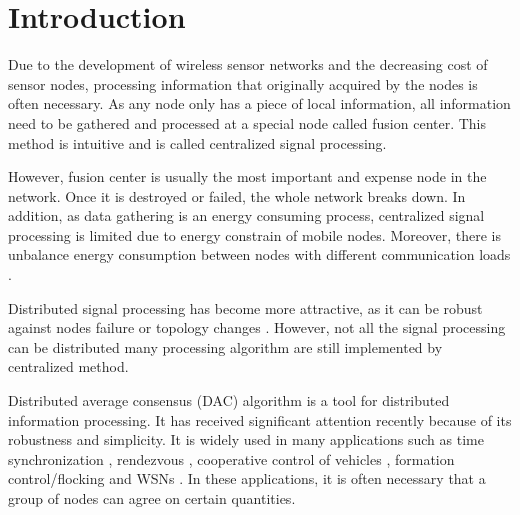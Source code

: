 
\chapter{Introduction }



































Due to the development of wireless sensor networks and the decreasing
cost of sensor nodes,  processing information that originally  acquired
by the nodes is often necessary. As any node only has a piece of local
information,  all information need to be gathered and processed at
a special node called  fusion center. This method is intuitive  and
is called centralized signal processing. 

However, fusion center is usually the most important and expense node
in the network. Once it is destroyed or failed, the whole network
breaks down. In addition, as data gathering is an energy consuming
process, centralized signal processing is limited due to energy constrain
of mobile nodes. Moreover, there is unbalance energy consumption between
nodes with different communication loads \cite{Cristescu2004}\cite{Yuen2008}. 

Distributed signal processing has become more attractive, as it can
be robust against  nodes failure or topology changes \cite{Chair1986}
. However, not all the signal processing can be distributed many processing
algorithm are still implemented by centralized method.

Distributed average consensus (DAC) algorithm is a tool for distributed
information processing. It has received significant attention recently
because of its robustness and simplicity. It is widely used in many
applications such as time synchronization \cite{Schenato2011}, rendezvous
\cite{Ren2008}, cooperative control of vehicles \cite{Yang2010},
formation control/flocking \cite{Olfati-Saber2012} and WSNs \cite{Hlinka2012}.
In these applications, it is often necessary that a group of nodes
can agree on certain quantities. 



